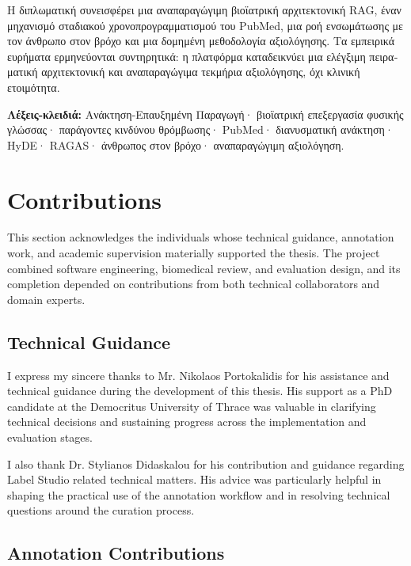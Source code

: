\begin{greek}
Η διπλωματική συνεισφέρει μια αναπαραγώγιμη βιοϊατρική αρχιτεκτονική RAG, έναν μηχανισμό σταδιακού χρονοπρογραμματισμού του PubMed, μια ροή ενσωμάτωσης με τον άνθρωπο στον βρόχο και μια δομημένη μεθοδολογία αξιολόγησης. Τα εμπειρικά ευρήματα ερμηνεύονται συντηρητικά: η πλατφόρμα καταδεικνύει μια ελέγξιμη πειραματική αρχιτεκτονική και αναπαραγώγιμα τεκμήρια αξιολόγησης, όχι κλινική ετοιμότητα.

\vspace{0.4cm}
\noindent \textbf{Λέξεις-κλειδιά:} Ανάκτηση-Επαυξημένη Παραγωγή· βιοϊατρική επεξεργασία φυσικής γλώσσας· παράγοντες κινδύνου θρόμβωσης· PubMed· διανυσματική ανάκτηση· HyDE· RAGAS· άνθρωπος στον βρόχο· αναπαραγώγιμη αξιολόγηση.
\end{greek}

\clearpage

\chapter*{Contributions}

This section acknowledges the individuals whose technical guidance, annotation work, and academic supervision materially supported the thesis. The project combined software engineering, biomedical review, and evaluation design, and its completion depended on contributions from both technical collaborators and domain experts.

\section*{Technical Guidance}

I express my sincere thanks to Mr. Nikolaos Portokalidis for his assistance and technical guidance during the development of this thesis. His support as a PhD candidate at the Democritus University of Thrace was valuable in clarifying technical decisions and sustaining progress across the implementation and evaluation stages.

I also thank Dr. Stylianos Didaskalou for his contribution and guidance regarding Label Studio related technical matters. His advice was particularly helpful in shaping the practical use of the annotation workflow and in resolving technical questions around the curation process.

\section*{Annotation Contributions}

